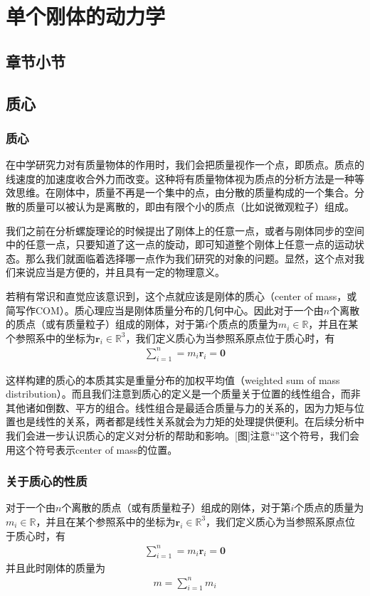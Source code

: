 \documentclass[12pt, a4paper, article, UTF8]{ctexart}
\begin{document}
\section{单个刚体的动力学}
\subsection{章节小节}
\subsection{质心}
\subsubsection{质心}
在中学研究力对有质量物体的作用时，我们会把质量视作一个点，即质点。质点的线速度的加速度收合外力而改变。这种将有质量物体视为质点的分析方法是一种等效思维。在刚体中，质量不再是一个集中的点，由分散的质量构成的一个集合。分散的质量可以被认为是离散的，即由有限个小的质点（比如说微观粒子）组成。

我们之前在分析螺旋理论的时候提出了刚体上的任意一点，或者与刚体同步的空间中的任意一点，只要知道了这一点的旋动，即可知道整个刚体上任意一点的运动状态。那么我们就面临着选择哪一点作为我们研究的对象的问题。显然，这个点对我们来说应当是方便的，并且具有一定的物理意义。

若稍有常识和直觉应该意识到，这个点就应该是刚体的质心（center of mass，或简写作COM）。质心理应当是刚体质量分布的几何中心。因此对于一个由$n$个离散的质点（或有质量粒子）组成的刚体，对于第$i$个质点的质量为$m_i\in\mathbb{R}$，并且在某个参照系中的坐标为$\mathbf{r}_i\in\mathbb{R}^3$，我们定义质心为当参照系原点位于质心时，有
\begin{align}
\sum^{n}_{i=1} = m_i\mathbf{r}_i = \mathbf{0}
\end{align}

这样构建的质心的本质其实是重量分布的加权平均值（weighted sum of mass distribution）。而且我们注意到质心的定义是一个质量关于位置的线性组合，而非其他诸如倒数、平方的组合。线性组合是最适合质量与力的关系的，因为力矩与位置也是线性的关系，两者都是线性关系就会为力矩的处理提供便利。在后续分析中我们会进一步认识质心的定义对分析的帮助和影响。[图]注意“\centerofmass ”这个符号，我们会用这个符号表示center of mass的位置。

\subsubsection{关于质心的性质}
\begin{mydefinition}
对于一个由$n$个离散的质点（或有质量粒子）组成的刚体，对于第$i$个质点的质量为$m_i\in\mathbb{R}$，并且在某个参照系中的坐标为$\mathbf{r}_i\in\mathbb{R}^3$，我们定义质心为当参照系原点位于质心时，有
\begin{align*}
\sum^{n}_{i=1} = m_i\mathbf{r}_i = \mathbf{0}
\end{align*}
并且此时刚体的质量为
\begin{align*}
m = \sum^{n}_{i=1} m_i
\end{align*}
\end{mydefinition}
\end{document}
